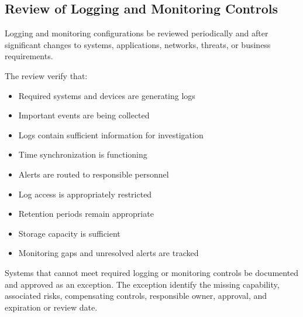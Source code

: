 \subsection{Review of Logging and Monitoring Controls}

Logging and monitoring configurations \must{} be reviewed periodically and after significant changes to systems, applications, networks, threats, or business requirements.

The review \should{} verify that:
\begin{itemize}
    \item Required systems and devices are generating logs
    \item Important events are being collected
    \item Logs contain sufficient information for investigation
    \item Time synchronization is functioning
    \item Alerts are routed to responsible personnel
    \item Log access is appropriately restricted
    \item Retention periods remain appropriate
    \item Storage capacity is sufficient
    \item Monitoring gaps and unresolved alerts are tracked
\end{itemize}

Systems that cannot meet required logging or monitoring controls \must{} be documented and approved as an exception. The exception \must{} identify the missing capability, associated risks, compensating controls, responsible owner, approval, and expiration or review date.